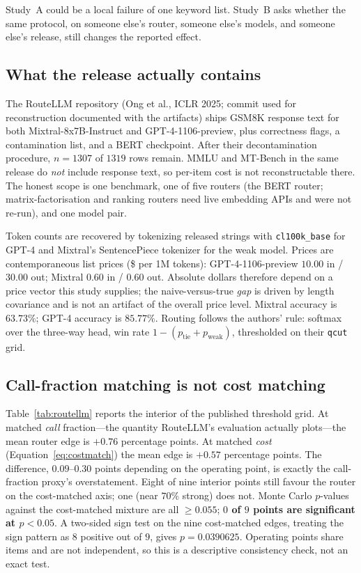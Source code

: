 \documentclass[a4paper,twoside]{article}
\begin{document}
Study~A could be a local failure of one keyword list. Study~B asks whether the same protocol, on someone else's router, someone else's models, and someone else's release, still changes the reported effect.

\subsection{What the release actually contains}

The RouteLLM repository (Ong et al., ICLR 2025; commit used for reconstruction documented with the artifacts) ships GSM8K response text for both Mixtral-8x7B-Instruct and GPT-4-1106-preview, plus correctness flags, a contamination list, and a BERT checkpoint. After their decontamination procedure, $n=1307$ of $1319$ rows remain. MMLU and MT-Bench in the same release do \emph{not} include response text, so per-item cost is not reconstructable there. The honest scope is one benchmark, one of five routers (the BERT router; matrix-factorisation and ranking routers need live embedding APIs and were not re-run), and one model pair.

Token counts are recovered by tokenizing released strings with \texttt{cl100k\_base} for GPT-4 and Mixtral's SentencePiece tokenizer for the weak model. Prices are contemporaneous list prices (\$ per 1M tokens): GPT-4-1106-preview $10.00$ in / $30.00$ out; Mixtral $0.60$ in / $0.60$ out. Absolute dollars therefore depend on a price vector this study supplies; the naive-versus-true \emph{gap} is driven by length covariance and is not an artifact of the overall price level. Mixtral accuracy is $63.73\%$; GPT-4 accuracy is $85.77\%$. Routing follows the authors' rule: softmax over the three-way head, win rate $1-(p_{\mathrm{tie}}+p_{\mathrm{weak}})$, thresholded on their \texttt{qcut} grid.

\subsection{Call-fraction matching is not cost matching}

Table~\ref{tab:routellm} reports the interior of the published threshold grid. At matched \emph{call} fraction---the quantity RouteLLM's evaluation actually plots---the mean router edge is $+0.76$ percentage points. At matched \emph{cost} (Equation~\eqref{eq:costmatch}) the mean edge is $+0.57$ percentage points. The difference, $0.09$--$0.30$ points depending on the operating point, is exactly the call-fraction proxy's overstatement. Eight of nine interior points still favour the router on the cost-matched axis; one (near $70\%$ strong) does not. Monte Carlo $p$-values against the cost-matched mixture are all $\ge 0.055$; \textbf{$0$ of $9$ points are significant at $p<0.05$}. A two-sided sign test on the nine cost-matched edges, treating the sign pattern as $8$ positive out of $9$, gives $p=0.0390625$. Operating points share items and are not independent, so this is a descriptive consistency check, not an exact test.
\end{document}

